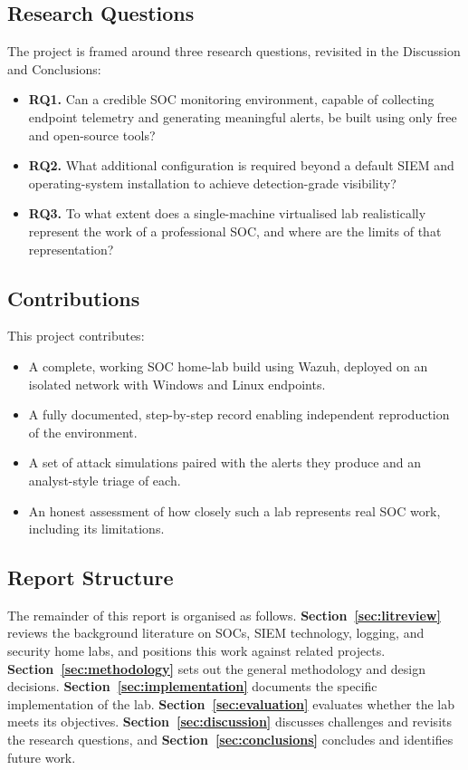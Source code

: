 \subsection{Research Questions}
\label{sec:rq}

The project is framed around three research questions, revisited in the
Discussion and Conclusions:

\begin{itemize}[leftmargin=*]
    \item \textbf{RQ1.} Can a credible SOC monitoring environment, capable of
          collecting endpoint telemetry and generating meaningful alerts, be
          built using only free and open-source tools?
    \item \textbf{RQ2.} What additional configuration is required beyond a
          default SIEM and operating-system installation to achieve
          detection-grade visibility?
    \item \textbf{RQ3.} To what extent does a single-machine virtualised lab
          realistically represent the work of a professional SOC, and where
          are the limits of that representation?
\end{itemize}

\subsection{Contributions}
\label{sec:contributions}

This project contributes:

\begin{itemize}[leftmargin=*]
    \item A complete, working SOC home-lab build using Wazuh, deployed on an
          isolated network with Windows and Linux endpoints.
    \item A fully documented, step-by-step record enabling independent
          reproduction of the environment.
    \item A set of attack simulations paired with the alerts they produce and
          an analyst-style triage of each.
    \item An honest assessment of how closely such a lab represents real SOC
          work, including its limitations.
\end{itemize}

\subsection{Report Structure}
\label{sec:structure}

The remainder of this report is organised as follows.
\textbf{Section~\ref{sec:litreview}} reviews the background literature on
SOCs, SIEM technology, logging, and security home labs, and positions this
work against related projects.
\textbf{Section~\ref{sec:methodology}} sets out the general methodology and
design decisions.
\textbf{Section~\ref{sec:implementation}} documents the specific
implementation of the lab.
\textbf{Section~\ref{sec:evaluation}} evaluates whether the lab meets its
objectives.
\textbf{Section~\ref{sec:discussion}} discusses challenges and revisits the
research questions, and \textbf{Section~\ref{sec:conclusions}} concludes and
identifies future work.
